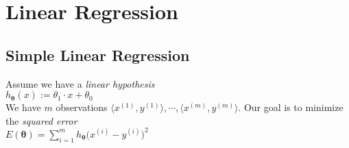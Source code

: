 \chapter{Linear Regression}
\section{Simple Linear Regression}
Assume we have a \emph{linear hypothesis} 
\\[0.2cm]
\hspace*{1.3cm}
$h_\mathbf{\theta}(x) := \theta_1 \cdot x + \theta_0$
\\[0.2cm]
We have $m$ observations $\langle x^{(1)}, y^{(1)}\rangle, \cdots, \langle x^{(m)}, y^{(m)}\rangle$.  Our goal is to minimize the \emph{squared error}
\\[0.2cm]
\hspace*{1.3cm}
$E(\mathbf{\theta}) = \sum\limits_{i=1}^m h_\mathbf{\theta}\bigl(x^{(i)} - y^{(i)}\bigr)^2$
\\[0.2cm]


